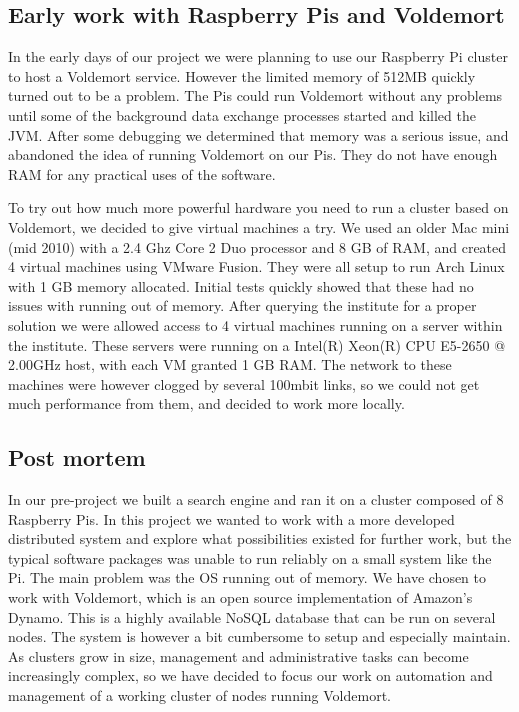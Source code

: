 \subsection*{Early work with Raspberry Pis and Voldemort}
In the early days of our project we were planning to use our Raspberry Pi cluster to host a Voldemort service. However the limited memory of 512MB quickly turned out to be a problem. The Pis could run Voldemort without any problems until some of the background data exchange processes started and killed the JVM. After some debugging we determined that memory was a serious issue, and abandoned the idea of running Voldemort on our Pis. They do not have enough RAM for any practical uses of the software.

To try out how much more powerful hardware you need to run a cluster based on Voldemort, we decided to give virtual machines a try. We used an older Mac mini (mid 2010) with a 2.4 Ghz Core 2 Duo processor and 8 GB of RAM, and created 4 virtual machines using VMware Fusion. They were all setup to run Arch Linux with 1 GB memory allocated. Initial tests quickly showed that these had no issues with running out of memory. After querying the institute for a proper solution we were allowed access to 4 virtual machines running on a server within the institute. These servers were running on a Intel(R) Xeon(R) CPU E5-2650 @ 2.00GHz host, with each VM granted 1 GB RAM. The network to these machines were however clogged by several 100mbit links, so we could not get much performance from them, and decided to work more locally.

\subsection*{Post mortem}
In our pre-project we built a search engine and ran it on a cluster composed of 8 Raspberry Pis. In this project we wanted to work with a more developed distributed system and explore what possibilities existed for further work, but the typical software packages was unable to run reliably on a small system like the Pi. The main problem was the OS running out of memory.
We have chosen to work with Voldemort, which is an open source implementation of Amazon’s Dynamo. This is a highly available NoSQL database that can be run on several nodes. The system is however a bit cumbersome to setup and especially maintain.
As clusters grow in size, management and administrative tasks can become increasingly complex, so we have decided to focus our work on automation and management of a working cluster of nodes running Voldemort. 

